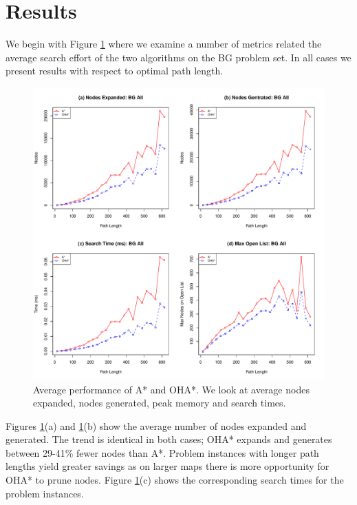 \section{Results}
\label{sec-results}
We begin with Figure \ref{fig-searcheffort} where we examine a number of metrics
related the average search effort of the two algorithms on the BG problem set.
In all cases we present results with respect to optimal path length.
\begin{figure}[htbp]
	\begin{center}
		       \includegraphics[scale=0.48, trim = 20mm 17mm 20mm 5mm]{diagrams/bg_effort.pdf}
	\end{center}
	\caption{Average performance of A* and OHA*. We look at average nodes expanded, nodes generated,
	peak memory and search times.}
	\label{fig-searcheffort}
\end{figure}
\par \indent
Figures \ref{fig-searcheffort}(a) and \ref{fig-searcheffort}(b)  show the average number of 
nodes expanded and generated. 
The trend is identical in both cases; OHA* expands and generates between 29-41\% fewer nodes than A*.
Problem instances with longer path lengths yield greater savings as on larger maps there is more 
opportunity for OHA* to prune nodes. 
Figure \ref{fig-searcheffort}(c) shows the corresponding search times for the problem instances. 
